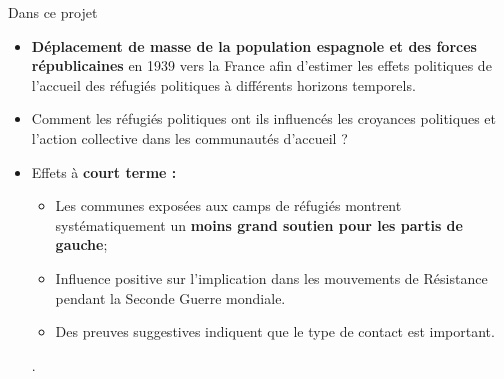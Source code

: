\documentclass[xcolor=dvipsnames, aspectratio=169]{beamer}
\begin{document}
\begin{frame}{Dans ce projet}
\vspace{0.1in}
\begin{itemize}
  \item \textbf{Déplacement de masse de la population espagnole et des forces républicaines} en 1939 vers la France afin d'estimer les effets politiques de l'accueil des réfugiés politiques à différents horizons temporels.
  \vspace{0.15in}
  \item Comment les réfugiés politiques ont ils influencés les croyances politiques et l'action collective dans les communautés d'accueil ?
  \vspace{0.2in}
  \item Effets à \textbf{court terme :} 
  \vspace{0.05in}
  \begin{itemize}
      \item Les communes exposées aux camps de réfugiés montrent systématiquement un \textbf{moins grand soutien pour les partis de gauche};
      \vspace{0.1in}
      \item Influence positive sur l'implication dans les mouvements de Résistance pendant la Seconde Guerre mondiale. 
      \vspace{0.1in}
      \item Des preuves suggestives indiquent que le type de contact est important.
  \end{itemize}. 
\end{itemize}

\end{frame}
\end{document}

